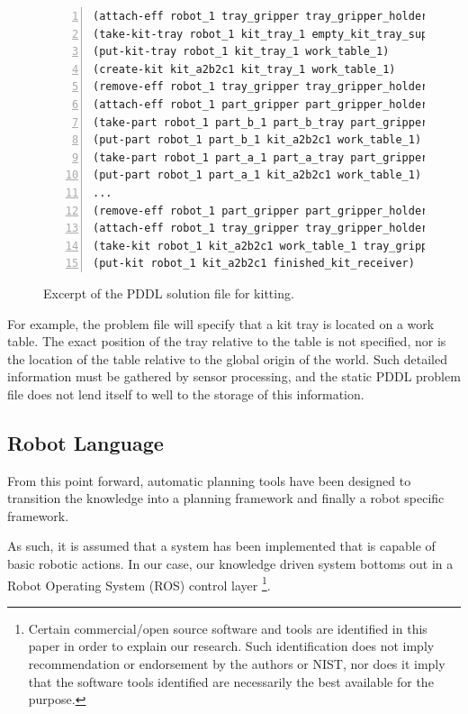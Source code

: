 \begin{figure}[t!h!]
\begin{minipage}{.5\paperwidth}
\begin{list}{}{\setlength{\leftmargin}{1em}}\item\small
\begin{Verbatim}[commandchars=\\\{\},fontsize=\scriptsize, numbers=left, numbersep=2pt]
(attach-eff robot_1 tray_gripper tray_gripper_holder)
(take-kit-tray robot_1 kit_tray_1 empty_kit_tray_supply tray_gripper work_table_1)
(put-kit-tray robot_1 kit_tray_1 work_table_1)
(create-kit kit_a2b2c1 kit_tray_1 work_table_1)
(remove-eff robot_1 tray_gripper tray_gripper_holder)
(attach-eff robot_1 part_gripper part_gripper_holder)
(take-part robot_1 part_b_1 part_b_tray part_gripper work_table_1 kit_a2b2c1)
(put-part robot_1 part_b_1 kit_a2b2c1 work_table_1)
(take-part robot_1 part_a_1 part_a_tray part_gripper work_table_1 kit_a2b2c1)
(put-part robot_1 part_a_1 kit_a2b2c1 work_table_1)
...
(remove-eff robot_1 part_gripper part_gripper_holder)
(attach-eff robot_1 tray_gripper tray_gripper_holder)
(take-kit robot_1 kit_a2b2c1 work_table_1 tray_gripper)
(put-kit robot_1 kit_a2b2c1 finished_kit_receiver)
\end{Verbatim}
\end{list}
\end{minipage}
\caption{Excerpt of the PDDL solution file for kitting.}
\label{fig:domain}
\end{figure}


For example, the problem file will specify that a kit tray is located
on a work table. The exact position of the tray relative to the table
is not specified, nor is the location of the table relative to the global
origin of the world. Such detailed information must be gathered by sensor
processing, and the static PDDL problem file does not lend itself to well
to the storage of this information.


\subsection{Robot Language}
From this point forward, automatic planning tools have been designed to transition 
the knowledge into a planning framework and finally a robot specific framework.

As such, it is assumed that a system has been implemented
that is capable of basic robotic actions. In our case, our knowledge
driven system bottoms out in a Robot Operating System (ROS) control layer
\footnote{Certain commercial/open source software and tools are identified 
in this paper in order to explain our research. Such identification does not imply
recommendation or endorsement by the authors or NIST, nor does it 
imply that the software tools identified are necessarily the best available for the purpose.}.